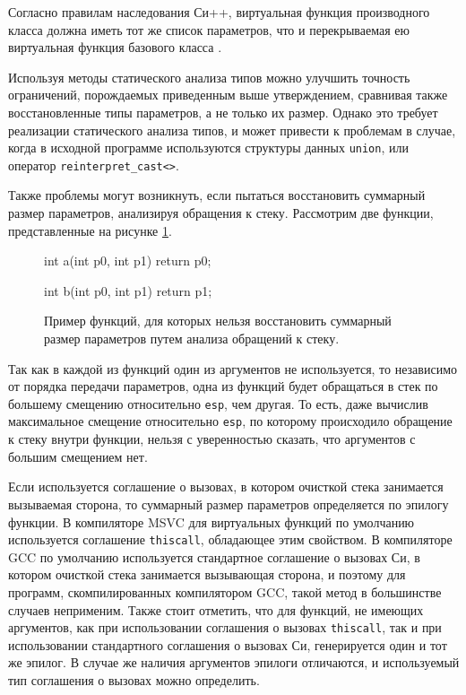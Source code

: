 Согласно правилам наследования Си++, виртуальная функция производного класса должна иметь тот же список параметров, что и перекрываемая ею виртуальная функция базового класса \cite{cpp03}.

Используя методы статического анализа типов можно улучшить точность ограничений, порождаемых приведенным выше утверждением, сравнивая также восстановленные типы параметров, а не только их размер. Однако это требует реализации статического анализа типов, и может привести к проблемам в случае, когда в исходной программе используются структуры данных \lstinline{union}, или оператор \lstinline{reinterpret_cast<>}.

Также проблемы могут возникнуть, если пытаться восстановить суммарный размер параметров, анализируя обращения к стеку. Рассмотрим две функции, представленные на рисунке \ref{listing:param_size}.

\begin{figure}[htb!]
\hspace{2cm}
\begin{minipage}[b]{1cm}
\begin{cplusplus}
int a(int p0, int p1) {
    return p0;
}

int b(int p0, int p1) {
    return p1;
}
\end{cplusplus}
\end{minipage}
\caption{Пример функций, для которых нельзя восстановить суммарный размер параметров путем анализа обращений к стеку.}
\label{listing:param_size}
\end{figure}

Так как в каждой из функций один из аргументов не используется, то независимо от порядка передачи параметров, одна из функций будет обращаться в стек по большему смещению относительно {\tt esp}, чем другая. То есть, даже вычислив максимальное смещение относительно {\tt esp}, по которому происходило обращение к стеку внутри функции, нельзя с уверенностью сказать, что аргументов с большим смещением нет.

Если используется соглашение о вызовах, в котором очисткой стека занимается вызываемая сторона, то суммарный размер параметров определяется по эпилогу функции. В компиляторе MSVC для виртуальных функций по умолчанию используется соглашение \lstinline{thiscall}, обладающее этим свойством. В компиляторе GCC по умолчанию используется стандартное соглашение о вызовах Си, в котором очисткой стека занимается вызывающая сторона, и поэтому для программ, скомпилированных компилятором GCC, такой метод в большинстве случаев неприменим. Также стоит отметить, что для функций, не имеющих аргументов, как при использовании соглашения о вызовах \lstinline{thiscall}, так и при использовании стандартного соглашения о вызовах Си, генерируется один и тот же эпилог. В случае же наличия аргументов эпилоги отличаются, и используемый тип соглашения о вызовах можно определить.

